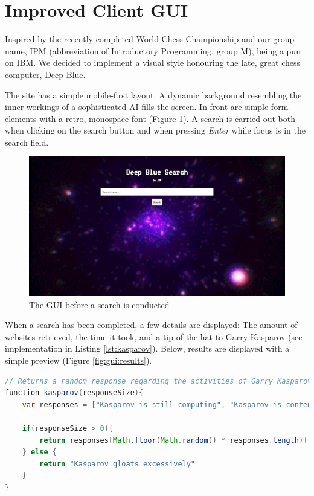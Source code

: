 \section{Improved Client GUI}
Inspired by the recently completed World Chess Championship and our group name, IPM (abbreviation of Introductory Programming, group M), being a pun on IBM. We decided to implement a visual style honouring the late, great chess computer, Deep Blue.

The site has a simple mobile-first layout. A dynamic background resembling the inner workings of a sophisticated AI fills the screen. In front are simple form elements with a retro, monospace font (Figure \ref{fig:gui:noResults}). A search is carried out both when clicking on the search button and when pressing \textit{Enter} while focus is in the search field. 

\begin{figure} [h]
	\centering
	\includegraphics[width=\textwidth]{graphics/gui-noResults.png}
	\caption{The GUI before a search is conducted}
	\label{fig:gui:noResults}
\end{figure}

When a search has been completed, a few details are displayed: The amount of websites retrieved, the time it took, and a tip of the hat to Garry Kasparov (see implementation in Listing \ref{lst:kasparov}). Below, results are displayed with a simple preview (Figure \ref{fig:gui:results}). 

\begin{lstlisting}[language=Java,
	caption={The Kasparov Algorithm},
	label={lst:kasparov}]
// Returns a random response regarding the activities of Garry Kasparov
function kasparov(responseSize){
	var responses = ["Kasparov is still computing", "Kasparov is contemplating e4", "Kasparov retrieved none", "Kasparov regrets the Sicilian Defense"];

	if(responseSize > 0){
		return responses[Math.floor(Math.random() * responses.length)];
	} else {
		return "Kasparov gloats excessively"
	}
}
\end{lstlisting}

